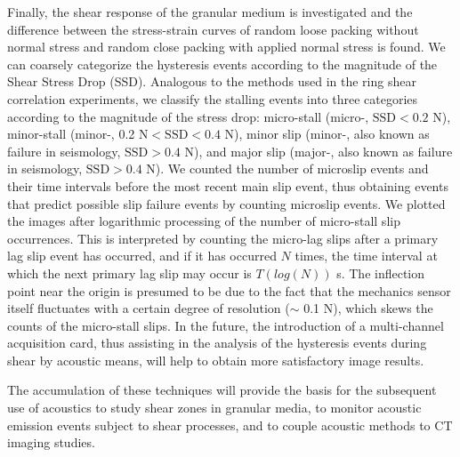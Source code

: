 \begin{digest}
    
    Finally, the shear response of the granular medium is investigated and the difference between the stress-strain curves of random loose packing without normal stress and random close packing with applied normal stress is found. We can coarsely categorize the hysteresis events according to the magnitude of the Shear Stress Drop (SSD). Analogous to the methods used in the ring shear correlation experiments, we classify the stalling events into three categories according to the magnitude of the stress drop: micro-stall (micro-, $\text{SSD}<0.2$ \unit{\newton}), minor-stall (minor-, 0.2 \unit{\newton}$<\text{SSD}<0.4$ \unit{ \newton}), minor slip (minor-, also known as failure in seismology, $\text{SSD}>0.4$ \unit{\newton}), and major slip (major-, also known as failure in seismology, $\text{SSD}>0.4$ \unit{\newton}).
    We counted the number of microslip events and their time intervals before the most recent main slip event, thus obtaining events that predict possible slip failure events by counting microslip events. We plotted the images after logarithmic processing of the number of micro-stall slip occurrences. This is interpreted by counting the micro-lag slips after a primary lag slip event has occurred, and if it has occurred $N$ times, the time interval at which the next primary lag slip may occur is $T(log{(N)})$ \unit{s}. The inflection point near the origin is presumed to be due to the fact that the mechanics sensor itself fluctuates with a certain degree of resolution ($\sim$ 0.1 \unit{\newton}), which skews the counts of the micro-stall slips. In the future, the introduction of a multi-channel acquisition card, thus assisting in the analysis of the hysteresis events during shear by acoustic means, will help to obtain more satisfactory image results.
    
    The accumulation of these techniques will provide the basis for the subsequent use of acoustics to study shear zones in granular media, to monitor acoustic emission events subject to shear processes, and to couple acoustic methods to CT imaging studies.

\end{digest}

